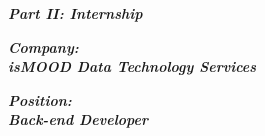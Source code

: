 
\begin{center}


\vspace*{\fill}

\textbf{\textit{\large Part II: Internship}}

\hfill

\textbf{\textit{Company:}} \\
\textbf{\textit{\large isMOOD Data Technology Services}}

\hfill

\textbf{\textit{Position:}} \\
\textbf{\textit{\large Back-end Developer}}

\vspace*{\fill}

\end{center}
